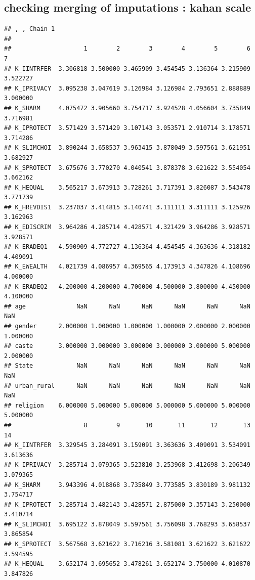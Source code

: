 \documentclass[
]{article}
\begin{document}
\renewcommand*{\arraystretch}{1}

\hypertarget{checking-merging-of-imputations-kahan-scale}{%
\subsection{checking merging of imputations : kahan
scale}\label{checking-merging-of-imputations-kahan-scale}}

\begin{verbatim}
## , , Chain 1
## 
##                    1        2        3        4        5        6        7
## K_IINTRFER  3.306818 3.500000 3.465909 3.454545 3.136364 3.215909 3.522727
## K_IPRIVACY  3.095238 3.047619 3.126984 3.126984 2.793651 2.888889 3.000000
## K_SHARM     4.075472 3.905660 3.754717 3.924528 4.056604 3.735849 3.716981
## K_IPROTECT  3.571429 3.571429 3.107143 3.053571 2.910714 3.178571 3.714286
## K_SLIMCHOI  3.890244 3.658537 3.963415 3.878049 3.597561 3.621951 3.682927
## K_SPROTECT  3.675676 3.770270 4.040541 3.878378 3.621622 3.554054 3.662162
## K_HEQUAL    3.565217 3.673913 3.728261 3.717391 3.826087 3.543478 3.771739
## K_HREVDIS1  3.237037 3.414815 3.140741 3.111111 3.311111 3.125926 3.162963
## K_EDISCRIM  3.964286 4.285714 4.428571 4.321429 3.964286 3.928571 3.928571
## K_ERADEQ1   4.590909 4.772727 4.136364 4.454545 4.363636 4.318182 4.409091
## K_EWEALTH   4.021739 4.086957 4.369565 4.173913 4.347826 4.108696 4.000000
## K_ERADEQ2   4.200000 4.200000 4.700000 4.500000 3.800000 4.450000 4.100000
## age              NaN      NaN      NaN      NaN      NaN      NaN      NaN
## gender      2.000000 1.000000 1.000000 1.000000 2.000000 2.000000 1.000000
## caste       3.000000 3.000000 3.000000 3.000000 3.000000 5.000000 2.000000
## State            NaN      NaN      NaN      NaN      NaN      NaN      NaN
## urban_rural      NaN      NaN      NaN      NaN      NaN      NaN      NaN
## religion    6.000000 5.000000 5.000000 5.000000 5.000000 5.000000 5.000000
##                    8        9       10       11       12       13       14
## K_IINTRFER  3.329545 3.284091 3.159091 3.363636 3.409091 3.534091 3.613636
## K_IPRIVACY  3.285714 3.079365 3.523810 3.253968 3.412698 3.206349 3.079365
## K_SHARM     3.943396 4.018868 3.735849 3.773585 3.830189 3.981132 3.754717
## K_IPROTECT  3.285714 3.482143 3.428571 2.875000 3.357143 3.250000 3.410714
## K_SLIMCHOI  3.695122 3.878049 3.597561 3.756098 3.768293 3.658537 3.865854
## K_SPROTECT  3.567568 3.621622 3.716216 3.581081 3.621622 3.621622 3.594595
## K_HEQUAL    3.652174 3.695652 3.478261 3.652174 3.750000 4.010870 3.847826

\end{verbatim}
\end{document}
